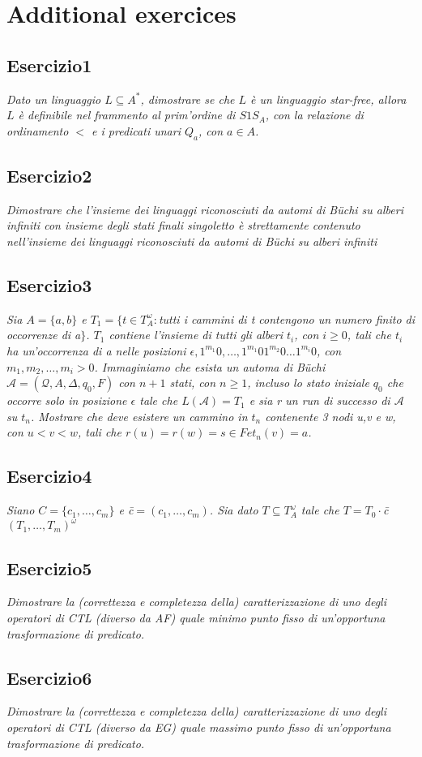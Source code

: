 \documentclass[12pt]{article}
\newcommand{\A}{\ensuremath{\mathcal{A}}\xspace}
\newcommand{\Buchi}{\ensuremath{\mathcal{A} = (\mathcal{Q},A,\Delta,q_0,F)}\xspace}
\newcommand{\buchi}{B\"uchi }
\begin{document}
\newpage
\section{Additional exercices}
\subsection*{Esercizio1}
\textit{Dato un linguaggio $L \subseteq A^*$, dimostrare se che $L$ è un linguaggio star-free, allora $L$ è definibile nel frammento al prim'ordine di $S1S_A$, con la relazione di ordinamento $<$ e i predicati unari $Q_a$, con $a \in A$.}


\subsection*{Esercizio2}
\textit{Dimostrare che l'insieme dei linguaggi riconosciuti da automi di \buchi su alberi infiniti con insieme degli stati finali singoletto è strettamente contenuto nell'insieme dei linguaggi riconosciuti da automi di \buchi su alberi infiniti}


\subsection*{Esercizio3}
\textit{Sia $A=\{a,b\}$ e $T_1=\{t\in T^{\omega}_A:$tutti i cammini di t contengono un numero finito di occorrenze di a$\}$. $T_1$ contiene l'insieme di tutti gli alberi $t_i$, con $i\geqslant 0$, tali che $t_i$ ha un'occorrenza di a nelle posizioni $\epsilon, 1^{m_1}0,\ldots,1^{m_1}01^{m_2}0\ldots 1^{m_i}0$, con $m_1,m_2,\ldots,m_i>0$. Immaginiamo che esista un automa di \buchi $\Buchi$ con $n+1$ stati, con $n\geqslant 1$, incluso lo stato iniziale $q_0$ che occorre solo in posizione $\epsilon$ tale che $L(\A)=T_1$ e sia r un run di successo di $\A$ su $t_n$. Mostrare che deve esistere un cammino in $t_n$ contenente 3 nodi u,v e w, con $u<v<w$, tali che $r(u)=r(w)=s \in F e t_n(v)=a$.}


\subsection*{Esercizio4}
\textit{Siano $C=\{c_1,\ldots,c_m\}$ e \=c$= ( c_1,\ldots,c_m) $. Sia dato $T \subseteq T^{\omega}_A$ tale che $T=T_0 \cdot$\=c$(T_1,\ldots,T_m)^{\omega}$}


\subsection*{Esercizio5}
\textit{Dimostrare la (correttezza e completezza della) caratterizzazione di uno degli operatori di CTL (diverso da AF) quale minimo punto fisso di un’opportuna trasformazione di predicato.}


\subsection*{Esercizio6}
\textit{Dimostrare la (correttezza e completezza della) caratterizzazione di uno degli operatori di CTL (diverso da EG) quale massimo punto fisso di un’opportuna trasformazione di predicato.}
\end{document}
